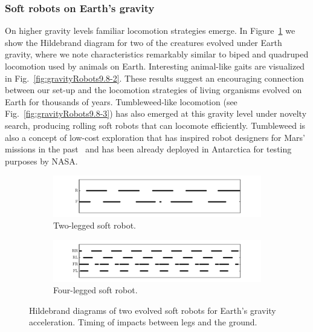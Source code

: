 \documentclass{sig-alternate}
\begin{document}
\subsubsection*{Soft robots on Earth's gravity}

On higher gravity levels familiar locomotion strategies emerge. In Figure~\ref{fig:hildebrand} we show the Hildebrand diagram for two of the creatures evolved under Earth gravity, where we note characteristics remarkably similar to biped and quadruped locomotion used by animals on Earth. Interesting animal-like gaits are visualized in Fig.~\ref{fig:gravityRobots9.8-2}. These results suggest an encouraging connection between our set-up and the locomotion strategies of living organisms evolved on Earth for thousands of years. Tumbleweed-like locomotion (see Fig.~\ref{fig:gravityRobots9.8-3}) has also emerged at this gravity level under novelty search, producing rolling soft robots that can locomote efficiently. 
Tumbleweed is also a concept of low-cost exploration that has inspired robot designers for Mars' missions in the past~\cite{antol2003low} and has been already deployed in Antarctica for testing purposes by NASA.

\begin{figure}[t!]
\vspace{.5cm}
\centering
\begin{subfigure}[b]{0.5\textwidth}
\centering
\includegraphics[width=1.0\textwidth]{../Figures/Results/hildebrand1.pdf}
\caption{Two-legged soft robot.}
\vspace{.63cm}
\end{subfigure}
\begin{subfigure}[b]{0.5\textwidth}
\centering
\includegraphics[width=1.0\textwidth]{../Figures/Results/hildebrand2.pdf}
\caption{Four-legged soft robot.}
\vspace{.62cm}
\end{subfigure}
\caption{Hildebrand diagrams of two evolved soft robots for Earth's gravity acceleration. Timing of impacts between legs and the ground.}
\label{fig:hildebrand}
\end{figure}
\end{document}
